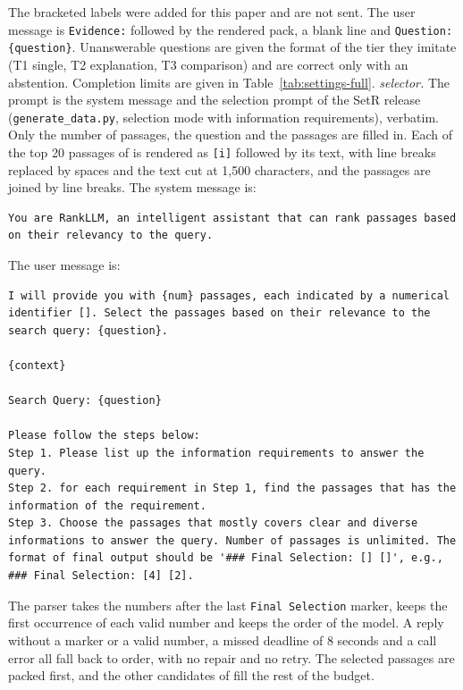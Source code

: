 \documentclass[preprint,12pt]{elsarticle}
\begin{document}
The bracketed labels were added for this paper and are not sent. The user message is \texttt{Evidence:} followed by the rendered pack, a blank line and \texttt{Question: \{question\}}. Unanswerable questions are given the format of the tier they imitate (T1 single, T2 explanation, T3 comparison) and are correct only with an abstention. Completion limits are given in Table~\ref{tab:settings-full}.
\emph{\setr{} selector.} The prompt is the system message and the selection prompt of the SetR release (\texttt{generate\_data.py}, selection mode with information requirements), verbatim. Only the number of passages, the question and the passages are filled in. Each of the top 20 passages of \hybrid{} is rendered as \texttt{[i]} followed by its text, with line breaks replaced by spaces and the text cut at 1,500 characters, and the passages are joined by line breaks. The system message is:
\begin{lstlisting}
You are RankLLM, an intelligent assistant that can rank passages based on their relevancy to the query.
\end{lstlisting}
The user message is:
\begin{lstlisting}
I will provide you with {num} passages, each indicated by a numerical identifier []. Select the passages based on their relevance to the search query: {question}.

{context}

Search Query: {question}

Please follow the steps below:
Step 1. Please list up the information requirements to answer the query.
Step 2. for each requirement in Step 1, find the passages that has the information of the requirement.
Step 3. Choose the passages that mostly covers clear and diverse informations to answer the query. Number of passages is unlimited. The format of final output should be '### Final Selection: [] []', e.g., ### Final Selection: [4] [2].
\end{lstlisting}
The parser takes the numbers after the last \texttt{Final Selection} marker, keeps the first occurrence of each valid number and keeps the order of the model. A reply without a marker or a valid number, a missed deadline of 8 seconds and a call error all fall back to \hybrid{} order, with no repair and no retry. The selected passages are packed first, and the other candidates of \hybrid{} fill the rest of the budget.
\end{document}
